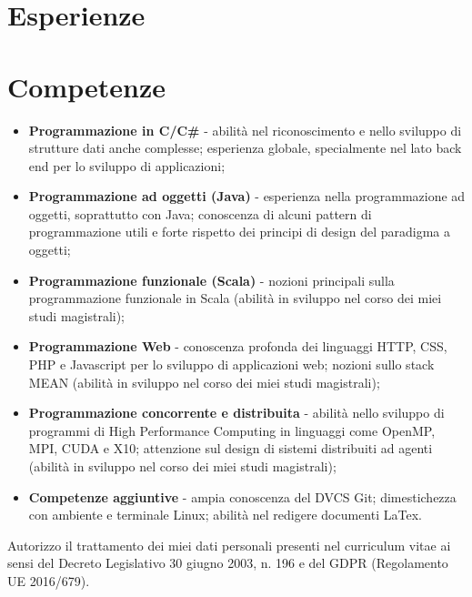 \documentclass[letterpaper]{template} %
\begin{document}
\section{Esperienze}

\begin{cvbox} %
\end{cvbox}

\section{Competenze}

\begin{itemize}
    \item \textbf{Programmazione in C/C\#} - abilità nel riconoscimento e nello sviluppo di strutture dati anche complesse; esperienza globale, specialmente nel lato back end per lo sviluppo di applicazioni;
    \item \textbf{Programmazione ad oggetti (Java)} - esperienza nella programmazione ad oggetti, soprattutto con Java; conoscenza di alcuni pattern di programmazione utili e forte rispetto dei principi di design del paradigma a oggetti;
    \item \textbf{Programmazione funzionale (Scala)} - nozioni principali sulla programmazione funzionale in Scala (abilità in sviluppo nel corso dei miei studi magistrali);
    \item \textbf{Programmazione Web} - conoscenza profonda dei linguaggi HTTP, CSS, PHP e Javascript per lo sviluppo di applicazioni web; nozioni sullo stack MEAN (abilità in sviluppo nel corso dei miei studi magistrali);
    \item \textbf{Programmazione concorrente e distribuita} - abilità nello sviluppo di programmi di High Performance Computing in linguaggi come OpenMP, MPI, CUDA e X10; attenzione sul design di sistemi distribuiti ad agenti (abilità in sviluppo nel corso dei miei studi magistrali);
     \item \textbf{Competenze aggiuntive} - ampia conoscenza del DVCS Git; dimestichezza con ambiente e terminale Linux; abilità nel redigere documenti LaTex.
\end{itemize}

\vspace{6mm}

\scriptsize{Autorizzo il trattamento dei miei dati personali presenti nel curriculum vitae ai sensi del Decreto Legislativo 30 giugno 2003, n. 196 e del GDPR (Regolamento UE 2016/679).}
\end{document}
